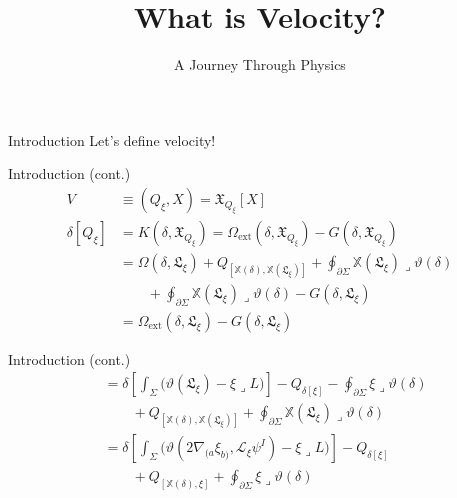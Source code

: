 \documentclass[aspectratio=169,11pt]{beamer}
\title{What is Velocity?}
\subtitle{A Journey Through Physics}
\author{}
\date{}
\begin{document}
\begin{frame}
\titlepage
\end{frame}

\begin{frame}{Introduction}
Let's define velocity!
\end{frame}

\begin{frame}[fragile]{Introduction (cont.)}
{\footnotesize
\begin{align*}
V &\equiv (Q_{\xi},X) = \mathfrak{X}_{Q_{\xi}}[X] \\[0.6ex]
\delta[Q_{\xi}] &= K(\delta,\mathfrak{X}_{Q_{\xi}}) = \Omega_{\mathrm{ext}}(\delta,\mathfrak{X}_{Q_{\xi}}) - G(\delta,\mathfrak{X}_{Q_{\xi}}) \\[0.8ex]
&= \Omega(\delta,\mathfrak{L}_{\xi}) + Q_{[\mathbb{X}(\delta),\mathbb{X}(\mathfrak{L}_{\xi})]}
  + \oint_{\partial\Sigma} \mathbb{X}(\mathfrak{L}_{\xi})\mathbin{\lrcorner}\vartheta(\delta) \\
&\qquad + \oint_{\partial\Sigma} \mathbb{X}(\mathfrak{L}_{\xi})\mathbin{\lrcorner}\vartheta(\delta) - G(\delta,\mathfrak{L}_{\xi}) \\[0.8ex]
&= \Omega_{\mathrm{ext}}(\delta,\mathfrak{L}_{\xi}) - G(\delta,\mathfrak{L}_{\xi})
\end{align*}
}
\end{frame}

\begin{frame}[fragile]{Introduction (cont.)}
{\footnotesize
\begin{align*}
&= \delta\!\left[\int_{\Sigma}\!\bigl(\vartheta(\mathfrak{L}_{\xi}) - \xi\mathbin{\lrcorner}L\bigr)\right]
   - Q_{\delta[\xi]} - \oint_{\partial\Sigma}\xi\mathbin{\lrcorner}\vartheta(\delta) \\
&\qquad + Q_{[\mathbb{X}(\delta),\mathbb{X}(\mathfrak{L}_{\xi})]}
  + \oint_{\partial\Sigma}\mathbb{X}(\mathfrak{L}_{\xi})\mathbin{\lrcorner}\vartheta(\delta) \\[1ex]
&= \delta\!\left[\int_{\Sigma}\!\bigl(\vartheta(2\nabla_{(a}\xi_{b)},\mathcal{L}_{\xi}\psi^{I}) - \xi\mathbin{\lrcorner}L\bigr)\right]
   - Q_{\delta[\xi]} \\
&\qquad + Q_{[\mathbb{X}(\delta),\xi]} + \oint_{\partial\Sigma}\xi\mathbin{\lrcorner}\vartheta(\delta)
\end{align*}
}
\end{frame}
\end{document}
